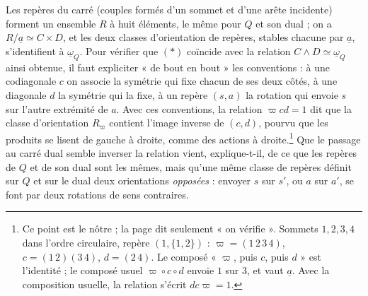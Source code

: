 \documentclass[11pt,a4paper]{article}
\begin{document}
Les repères du carré (couples formés d'un sommet et d'une arête incidente)
forment un ensemble $R$ à huit éléments, le même pour $Q$ et son dual ; on a
$R/\underline{a} \simeq C \times D$, et les deux classes d'orientation de
repères, stables chacune par $\underline{a}$, s'identifient à
$\underline{\omega}_Q$. Pour vérifier que $(*)$ coïncide avec la relation
$C \wedge D \simeq \underline{\omega}_Q$ ainsi obtenue, il faut expliciter « de
bout en bout » les conventions : à une codiagonale $c$ on associe la symétrie
qui fixe chacun de ses deux côtés, à une diagonale $d$ la symétrie qui la fixe,
à un repère $(s, a)$ la rotation qui envoie $s$ sur l'autre extrémité de $a$.
Avec ces conventions, la relation $\varpi c d = 1$ dit que la classe
d'orientation $R_\varpi$ contient l'image inverse de $(c, d)$, pourvu que les
produits se lisent de gauche à droite, comme des actions à droite.\footnote{Ce
point est le nôtre ; la page dit seulement « on vérifie ». Sommets $1, 2, 3, 4$
dans l'ordre circulaire, repère $(1, \{1,2\})$ : $\varpi = (1\,2\,3\,4)$,
$c = (1\,2)(3\,4)$, $d = (2\,4)$. Le composé « $\varpi$, puis $c$, puis $d$ »
est l'identité ; le composé usuel $\varpi \circ c \circ d$ envoie $1$ sur $3$,
et vaut $\underline{a}$. Avec la composition usuelle, la relation s'écrit
$d c \varpi = 1$.} Que le passage au carré dual semble inverser la relation
vient, explique-t-il, de ce que les repères de $Q$ et de son dual sont les
mêmes, mais qu'une même classe de repères définit sur $Q$ et sur le dual deux
orientations \emph{opposées} : envoyer $s$ sur $s'$, ou $a$ sur $a'$, se font
par deux rotations de sens contraires.
\end{document}
